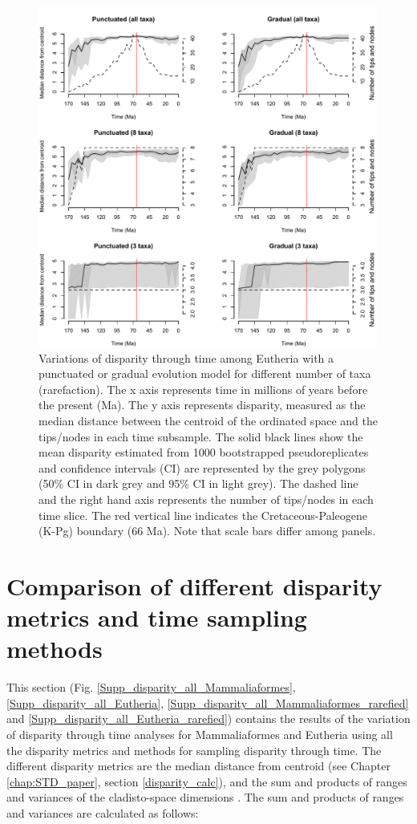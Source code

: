 \begin{figure}
\centering
    \includegraphics[keepaspectratio=true]{Supplementaries/Figures/STD/Rarefaction-beck.pdf}
\caption[Eutheria disparity (rarefied)]{Variations of disparity through time among Eutheria with a punctuated or gradual evolution model for different number of taxa (rarefaction). The x axis represents time in millions of years before the present (Ma). The y axis represents disparity, measured as the median distance between the centroid of the ordinated space and the tips/nodes in each time subsample. The solid black lines show the mean disparity estimated from 1000 bootstrapped pseudoreplicates and confidence intervals (CI) are represented by the grey polygons (50\% CI in dark grey and 95\% CI in light grey). The dashed line and the right hand axis represents the number of tips/nodes in each time slice. The red vertical line indicates the Cretaceous-Paleogene (K-Pg) boundary (66 Ma). Note that scale bars differ among panels.}
\label{Supp_Eutheria_rarefied}
\end{figure}

\newpage
\section{Comparison of different disparity metrics and time sampling methods}
This section (Fig. \ref{Supp_disparity_all_Mammaliaformes}, \ref{Supp_disparity_all_Eutheria}, \ref{Supp_disparity_all_Mammaliaformes_rarefied} and \ref{Supp_disparity_all_Eutheria_rarefied}) contains the results of the variation of disparity through time analyses for Mammaliaformes and Eutheria using all the disparity metrics and methods for sampling disparity through time.
The different disparity metrics are the median distance from centroid (see Chapter \ref{chap:STD_paper}, section \ref{disparity_calc}), and the sum and products of ranges and variances of the cladisto-space dimensions \citep{Wills1994}.
The sum and products of ranges and variances are calculated as follows:

